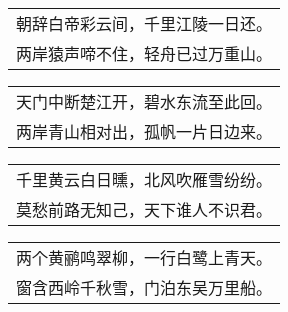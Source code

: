 \noindent\begin{minipage}{\linewidth}
  \vskip-3pt\begin{table}[H]
    \centering
    \begin{tabular}{@{}l@{}}
朝辞白帝彩云间，千里江陵一日还。\\
两岸猿声啼不住，轻舟已过万重山。
    \end{tabular}
  \end{table}
\end{minipage}
\vspace{1cm}


\noindent\begin{minipage}{\linewidth}
  \vskip-3pt\begin{table}[H]
    \centering
    \begin{tabular}{@{}l@{}}
天门中断楚江开，碧水东流至此回。\\
两岸青山相对出，孤帆一片日边来。
    \end{tabular}
  \end{table}
\end{minipage}
\vspace{1cm}


\noindent\begin{minipage}{\linewidth}
  \vskip-3pt\begin{table}[H]
    \centering
    \begin{tabular}{@{}l@{}}
千里黄云白日曛，北风吹雁雪纷纷。\\
莫愁前路无知己，天下谁人不识君。
    \end{tabular}
  \end{table}
\end{minipage}
\vspace{1cm}


\noindent\begin{minipage}{\linewidth}
  \vskip-3pt\begin{table}[H]
    \centering
    \begin{tabular}{@{}l@{}}
两个黄鹂鸣翠柳，一行白鹭上青天。\\
窗含西岭千秋雪，门泊东吴万里船。
    \end{tabular}
  \end{table}
\end{minipage}
\vspace{1cm}


